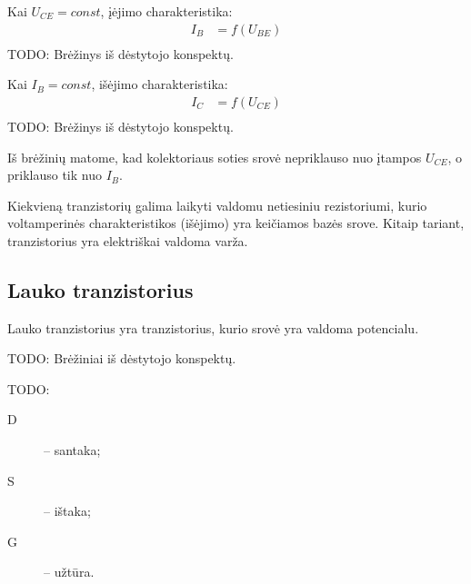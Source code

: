 Kai $U_{CE} = const$, įėjimo charakteristika:
\begin{align*}
  I_{B} &= f(U_{BE}) \\
\end{align*}
TODO: Brėžinys iš dėstytojo konspektų.

Kai $I_{B} = const$, išėjimo charakteristika:
\begin{align*}
  I_{C} &= f(U_{CE}) \\
\end{align*}
TODO: Brėžinys iš dėstytojo konspektų.

Iš brėžinių matome, kad kolektoriaus soties srovė nepriklauso nuo
įtampos $U_{CE}$, o priklauso tik nuo $I_{B}$.

Kiekvieną tranzistorių galima laikyti valdomu netiesiniu rezistoriumi,
kurio voltamperinės charakteristikos (išėjimo) yra keičiamos bazės
srove. Kitaip tariant, tranzistorius yra elektriškai valdoma varža.

\subsection{Lauko tranzistorius}

Lauko tranzistorius yra tranzistorius, kurio srovė yra valdoma
potencialu.

TODO: Brėžiniai iš dėstytojo konspektų.

TODO:
\begin{description}
  \item[D] – santaka;
  \item[S] – ištaka;
  \item[G] – užtūra.
\end{description}

